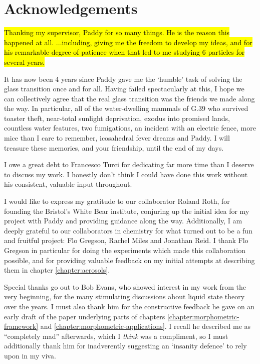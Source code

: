 
\chapter*{Acknowledgements}

\hl{Thanking my supervisor, Paddy for so many things.
  He is the reason this happened at all.
  ...including, giving me the freedom to develop my ideas, and for his remarkable degree of patience when that led to me studying 6 particles for several years.}

It has now been 4 years since Paddy gave me the `humble' task of solving the glass transition once and for all.
Having failed spectacularly at this, I hope we can collectively agree that the real glass transition was the friends we made along the way.
In particular, all of the water-dwelling mammals of G.39 who survived toaster theft, near-total sunlight deprivation, exodus into promised lands, countless water features, two fumigations, an incident with an electric fence, more mice than I care to remember, icosahedral fever dreams and Paddy.
I will treasure these memories, and your friendship, until the end of my days.

I owe a great debt to Francesco Turci for dedicating far more time than I deserve to discuss my work.
I honestly don't think I could have done this work without his consistent, valuable input throughout.

I would like to express my gratitude to our collaborator Roland Roth, for founding the Bristol's White Bear institute, conjuring up the initial idea for my project with Paddy and providing guidance along the way.
Additionally, I am deeply grateful to our collaborators in chemistry for what turned out to be a fun and fruitful project: Flo Gregson, Rachel Miles and Jonathan Reid.
I thank Flo Gregson in particular for doing the experiments which made this collaboration possible, and for providing valuable feedback on my initial attempts at describing them in chapter \ref{chapter:aerosols}.

Special thanks go out to Bob Evans, who showed interest in my work from the very beginning, for the many stimulating discussions about liquid state theory over the years.
I must also thank him for the constructive feedback he gave on an early draft of the paper underlying parts of chapters \ref{chapter:morphometric-framework} and \ref{chapter:morphometric-applications}.
I recall he described me as ``completely mad'' afterwards, which I \emph{think} was a compliment, so I must additionally thank him for inadverently suggesting an `insanity defence' to rely upon in my viva.

